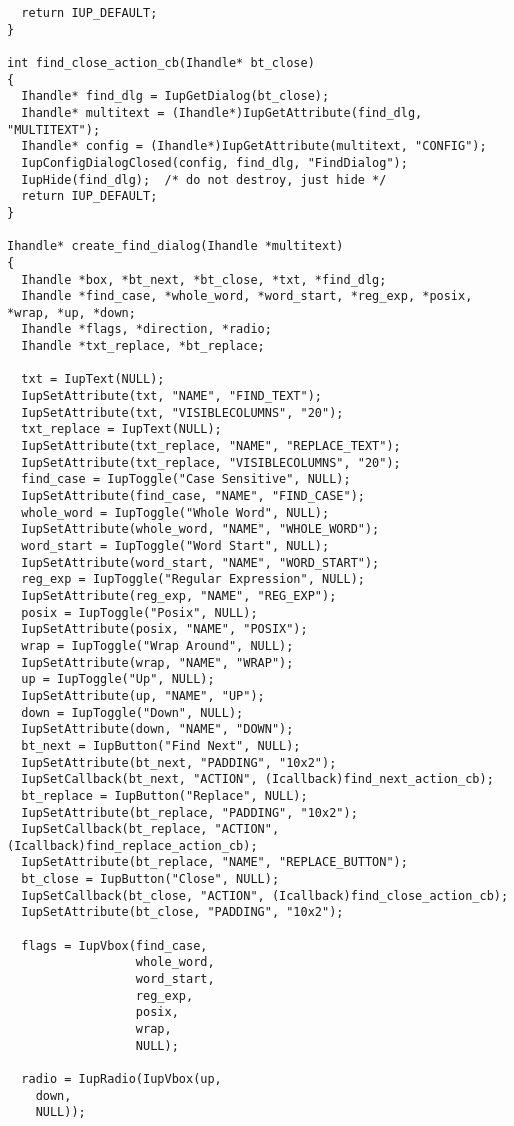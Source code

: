 \documentclass{ctexart}
\begin{document}
\begin{lstlisting}
  return IUP_DEFAULT;
}

int find_close_action_cb(Ihandle* bt_close)
{
  Ihandle* find_dlg = IupGetDialog(bt_close);
  Ihandle* multitext = (Ihandle*)IupGetAttribute(find_dlg, "MULTITEXT");
  Ihandle* config = (Ihandle*)IupGetAttribute(multitext, "CONFIG");
  IupConfigDialogClosed(config, find_dlg, "FindDialog");
  IupHide(find_dlg);  /* do not destroy, just hide */
  return IUP_DEFAULT;
}

Ihandle* create_find_dialog(Ihandle *multitext)
{
  Ihandle *box, *bt_next, *bt_close, *txt, *find_dlg;
  Ihandle *find_case, *whole_word, *word_start, *reg_exp, *posix, *wrap, *up, *down;
  Ihandle *flags, *direction, *radio;
  Ihandle *txt_replace, *bt_replace;

  txt = IupText(NULL);
  IupSetAttribute(txt, "NAME", "FIND_TEXT");
  IupSetAttribute(txt, "VISIBLECOLUMNS", "20");
  txt_replace = IupText(NULL);
  IupSetAttribute(txt_replace, "NAME", "REPLACE_TEXT");
  IupSetAttribute(txt_replace, "VISIBLECOLUMNS", "20");
  find_case = IupToggle("Case Sensitive", NULL);
  IupSetAttribute(find_case, "NAME", "FIND_CASE");
  whole_word = IupToggle("Whole Word", NULL);
  IupSetAttribute(whole_word, "NAME", "WHOLE_WORD");
  word_start = IupToggle("Word Start", NULL);
  IupSetAttribute(word_start, "NAME", "WORD_START");
  reg_exp = IupToggle("Regular Expression", NULL);
  IupSetAttribute(reg_exp, "NAME", "REG_EXP");
  posix = IupToggle("Posix", NULL);
  IupSetAttribute(posix, "NAME", "POSIX");
  wrap = IupToggle("Wrap Around", NULL);
  IupSetAttribute(wrap, "NAME", "WRAP");
  up = IupToggle("Up", NULL);
  IupSetAttribute(up, "NAME", "UP");
  down = IupToggle("Down", NULL);
  IupSetAttribute(down, "NAME", "DOWN");
  bt_next = IupButton("Find Next", NULL);
  IupSetAttribute(bt_next, "PADDING", "10x2");
  IupSetCallback(bt_next, "ACTION", (Icallback)find_next_action_cb);
  bt_replace = IupButton("Replace", NULL);
  IupSetAttribute(bt_replace, "PADDING", "10x2");
  IupSetCallback(bt_replace, "ACTION", (Icallback)find_replace_action_cb);
  IupSetAttribute(bt_replace, "NAME", "REPLACE_BUTTON");
  bt_close = IupButton("Close", NULL);
  IupSetCallback(bt_close, "ACTION", (Icallback)find_close_action_cb);
  IupSetAttribute(bt_close, "PADDING", "10x2");

  flags = IupVbox(find_case,
                  whole_word,
                  word_start,
                  reg_exp,
                  posix,
                  wrap,
                  NULL);

  radio = IupRadio(IupVbox(up,
    down,
    NULL));


\end{lstlisting}
\end{document}
